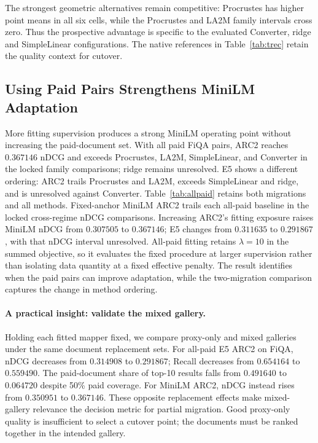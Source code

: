 The strongest geometric alternatives remain competitive: Procrustes has
higher point means in all six cells, while the Procrustes and LA2M family
intervals cross zero. Thus the prospective advantage is specific to the
evaluated Converter, ridge and SimpleLinear configurations. The native
references in Table~\ref{tab:trec} retain the quality context for cutover.

\subsection{Using Paid Pairs Strengthens MiniLM Adaptation}

More fitting supervision produces a strong MiniLM operating point without
increasing the paid-document set. With all paid FiQA pairs, ARC2 reaches
$0.367146$ nDCG and exceeds
Procrustes, LA2M, SimpleLinear, and Converter in the locked family comparisons;
ridge remains unresolved. E5 shows a different ordering: ARC2 trails
Procrustes and LA2M, exceeds SimpleLinear and ridge, and is unresolved
against Converter. Table~\ref{tab:allpaid} retains both migrations and all
methods. Fixed-anchor MiniLM ARC2 trails each all-paid baseline in the
locked cross-regime nDCG comparisons. Increasing ARC2's fitting exposure raises MiniLM nDCG from
$0.307505$ to $0.367146$; E5 changes from $0.311635$ to $0.291867$, with
that nDCG interval unresolved. All-paid fitting retains $\lambda=10$ in
the summed objective, so it evaluates the fixed procedure at larger
supervision rather than isolating data quantity at a fixed effective penalty.
The result identifies when the paid pairs
can improve adaptation, while the two-migration comparison captures the change
in method ordering.

\paragraph{A practical insight: validate the mixed gallery.}
Holding each fitted mapper fixed, we compare proxy-only and mixed
galleries under the same document replacement sets.
For all-paid E5 ARC2 on FiQA, nDCG decreases from $0.314908$ to $0.291867$;
Recall decreases from $0.654164$ to $0.559490$. The paid-document share of
top-10 results falls from $0.491640$ to $0.064720$ despite 50\% paid coverage.
For MiniLM ARC2, nDCG instead rises from $0.350951$ to $0.367146$.
These opposite replacement effects make mixed-gallery relevance the
decision metric for partial migration. Good proxy-only quality is
insufficient to select a cutover point; the documents must be ranked
together in the intended gallery.

